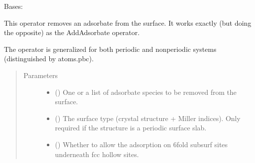 \documentclass[letterpaper,10pt,english]{sphinxmanual}
\begin{document}
\begin{fulllineitems}
\label{\detokenize{ga:acat.ga.adsorbate_operators.RemoveAdsorbate}}
Bases: {\hyperref[\detokenize{ga:acat.ga.adsorbate_operators.AdsorbateOperator}]{}}

This operator removes an adsorbate from the surface. It works
exactly (but doing the opposite) as the AddAdsorbate operator.

The operator is generalized for both periodic and non\sphinxhyphen{}periodic systems
(distinguished by atoms.pbc).
\begin{quote}\begin{description}
\item[{Parameters}] \leavevmode\begin{itemize}
\item {} 
 () \textendash{} One or a list of adsorbate species to be removed from the surface.

\item {} 
 (\sphinxstyleliteralemphasis{\sphinxupquote{, }}) \textendash{} The surface type (crystal structure + Miller indices).
Only required if the structure is a periodic surface slab.

\item {} 
 (\sphinxstyleliteralemphasis{\sphinxupquote{, }}) \textendash{} Whether to allow the adsorption on 6\sphinxhyphen{}fold subsurf sites underneath
fcc hollow sites.


\end{itemize}
\end{description}
\end{quote}
\end{fulllineitems}
\end{document}
